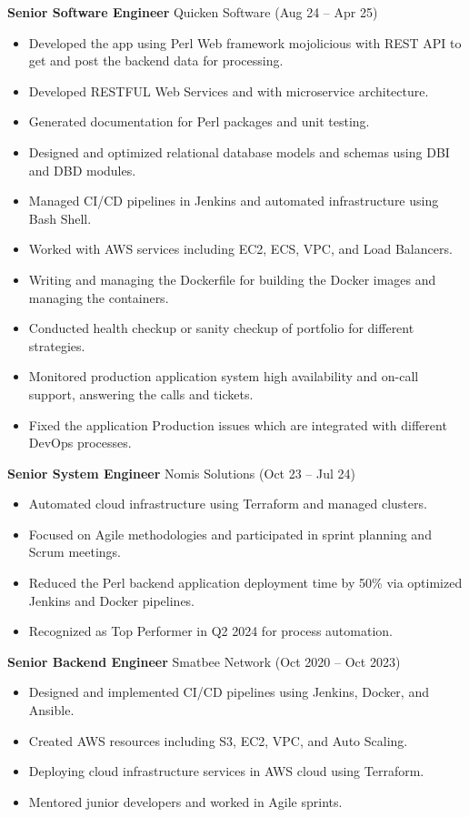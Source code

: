 \documentclass[11pt,a4paper]{article}
\begin{document}
\begin{itemize}[leftmargin=*]
\textbf{Senior Software Engineer} \hfill Quicken Software (Aug 24 – Apr 25) \\
\begin{itemize}[leftmargin=*]
  \item Developed the app using Perl Web framework mojolicious with REST API to get and post the backend data for processing. 
  \item Developed RESTFUL Web Services and with microservice architecture.
  \item Generated documentation for Perl packages and unit testing. 
  \item Designed and optimized relational database models and schemas using DBI and DBD modules.
  \item Managed CI/CD pipelines in Jenkins and automated infrastructure using Bash Shell.
  \item Worked with AWS services including EC2, ECS, VPC, and Load Balancers.
  \item Writing and managing the Dockerfile for building the Docker images and managing the containers.
  \item Conducted health checkup or sanity checkup of portfolio for different strategies.
  \item Monitored production application system high availability and on-call support, answering the calls and tickets.
  \item Fixed the application Production issues which are integrated with different DevOps processes.
\end{itemize}

\vspace{1em}
\textbf{Senior System Engineer} \hfill Nomis Solutions (Oct 23 – Jul 24) \\
\begin{itemize}[leftmargin=*]
  \item Automated cloud infrastructure using Terraform and managed clusters.
  \item Focused on Agile methodologies and participated in sprint planning and Scrum meetings. 
  \item Reduced the Perl backend application deployment time by 50\% via optimized Jenkins and Docker pipelines.
  \item Recognized as Top Performer in Q2 2024 for process automation.
\end{itemize}

\vspace{1em}

\textbf{Senior Backend Engineer} \hfill Smatbee Network (Oct 2020 – Oct 2023) \\
\begin{itemize}[leftmargin=*]
  \item Designed and implemented CI/CD pipelines using Jenkins, Docker, and Ansible.
  \item Created AWS resources including S3, EC2, VPC, and Auto Scaling.
  \item Deploying cloud infrastructure services in AWS cloud using Terraform.
  \item Mentored junior developers and worked in Agile sprints.
\end{itemize}


\end{itemize}
\end{document}
